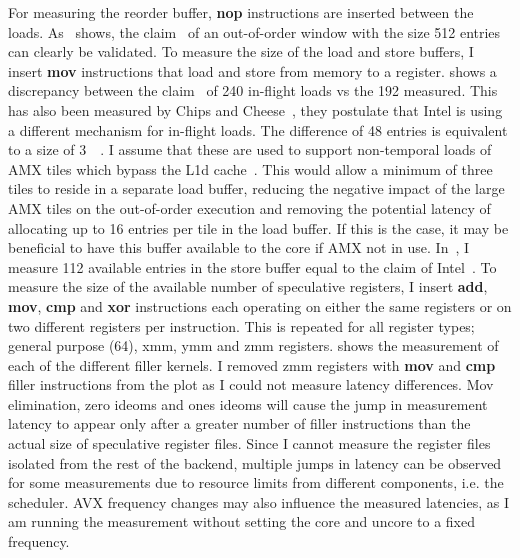 For measuring the reorder buffer, \textbf{nop} instructions are inserted between the loads.
As~ shows, the claim~\cite{ServerTheHome_2023_SPR_Press,Wccftech_2023_SPR_Press} of an out-of-order window with the size \SI{512}{} entries can clearly be validated.
To measure the size of the load and store buffers, I insert \textbf{mov} instructions that load and store from memory to a register.
 shows a discrepancy between the claim~\cite{ServerTheHome_2023_SPR_Press,Wccftech_2023_SPR_Press} of 240 in-flight loads vs the 192 measured.
This has also been measured by Chips and Cheese~\cite{Chipsandcheese_2023_GoldenCove_Vector_Register}, they postulate that Intel is using a different mechanism for in-flight loads.
The difference of 48 entries is equivalent to a size of \SI{3}{\kibi\byte}.
I assume that these are used to support non-temporal loads of \ac{AMX} tiles which bypass the L1d cache~\cite[Sec. 20.8]{Intel_Optimization_Reference_Manual_050}.
This would allow a minimum of three tiles to reside in a separate load buffer, reducing the negative impact of the large \ac{AMX} tiles on the out-of-order execution and removing the potential latency of allocating up to 16 entries per tile in the load buffer.
If this is the case, it may be beneficial to have this buffer available to the core if \ac{AMX} not in use.
In~, I measure 112 available entries in the store buffer equal to the claim of Intel~\cite{ServerTheHome_2023_SPR_Press,Wccftech_2023_SPR_Press}.
To measure the size of the available number of speculative registers, I insert \textbf{add}, \textbf{mov}, \textbf{cmp} and \textbf{xor} instructions each operating on either the same registers or on two different registers per instruction.
This is repeated for all register types; general purpose (\SI{64}{\bit}), xmm, ymm and zmm registers.
 shows the measurement of each of the different filler kernels.
I removed zmm registers with \textbf{mov} and \textbf{cmp} filler instructions from the plot as I could not measure latency differences.
Mov elimination, zero ideoms and ones ideoms will cause the jump in measurement latency to appear only after a greater number of filler instructions than the actual size of speculative register files.
Since I cannot measure the register files isolated from the rest of the backend, multiple jumps in latency can be observed for some measurements due to resource limits from different components, i.e. the scheduler.
\ac{AVX} frequency changes may also influence the measured latencies, as I am running the measurement without setting the core and uncore to a fixed frequency.
